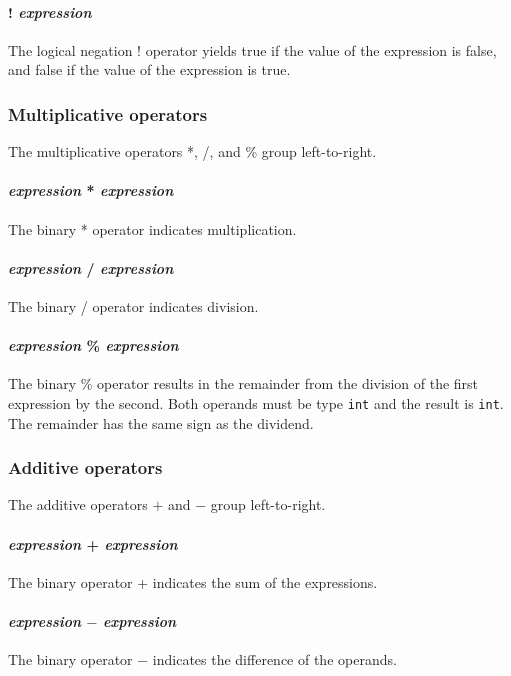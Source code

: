 \paragraph{! \textit{expression}}
The logical negation ! operator yields true if the value of the expression is false, and false if the value of the expression is true. 

\subsubsection{Multiplicative operators}
The multiplicative operators *, /, and \% group left-to-right.

\paragraph{\textit{expression} * \textit{expression}}
The binary * operator indicates multiplication.

\paragraph{\textit{expression} / \textit{expression}}
The binary / operator indicates division.

\paragraph{\textit{expression} \% \textit{expression}}
The  binary \% operator results in the remainder from the division of the first expression by the second. Both operands must be type \texttt{int} and the result is \texttt{int}. The remainder has the same sign as the dividend.
\\
\subsubsection{Additive operators}
The additive operators $+$ and $-$ group left-to-right.

\paragraph{\textit{expression} + \textit{expression}}
The binary  operator + indicates the sum of the expressions.

\paragraph{\textit{expression} $-$ \textit{expression}}
The binary operator $-$ indicates the difference of the operands.
\\
